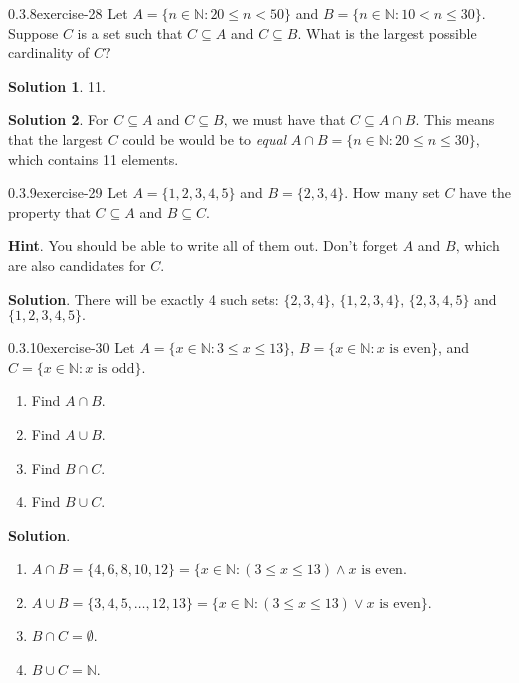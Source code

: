 \documentclass[twoside,11pt,]{book}
\numberwithin{equation}{chapter}
\newcommand{\N}{\mathbb N}
\newcommand{\st}{:}
\newcommand{\lt}{<}
\begin{document}
\begin{divisionsolution}{0.3.8}{}{exercise-28}%
\hypertarget{p-662}{}%
Let \(A = \{n \in \N \st 20 \le n \lt 50\}\) and \(B = \{n \in \N \st 10 \lt n \le 30\}\text{.}\) Suppose \(C\) is a set such that \(C \subseteq A\) and \(C \subseteq B\text{.}\) What is the largest possible cardinality of \(C\text{?}\)%
\par\smallskip%
\noindent\textbf{Solution 1}.\quad%
\hypertarget{p-663}{}%
11.%
\par\smallskip%
\noindent\textbf{Solution 2}.\quad%
\hypertarget{p-664}{}%
For \(C \subseteq A\) and \(C \subseteq B\text{,}\) we must have that \(C \subseteq A \cap B\text{.}\) This means that the largest \(C\) could be would be to \emph{equal} \(A \cap B = \{n \in \N \st 20 \le n \le 30\}\text{,}\) which contains 11 elements.%
\end{divisionsolution}%
\begin{divisionsolution}{0.3.9}{}{exercise-29}%
\hypertarget{p-669}{}%
Let \(A = \{1,2,3,4,5\}\) and \(B = \{2, 3, 4\}\text{.}\) How many set \(C\) have the property that \(C \subseteq A\) and \(B \subseteq C\text{.}\)%
\par\smallskip%
\noindent\textbf{Hint}.\quad%
\hypertarget{p-671}{}%
You should be able to write all of them out. Don't forget \(A\) and \(B\text{,}\) which are also candidates for \(C\text{.}\)%
\par\smallskip%
\noindent\textbf{Solution}.\quad%
\hypertarget{p-672}{}%
There will be exactly 4 such sets: \(\{2, 3, 4\}\text{,}\) \(\{1,2,3,4\}\text{,}\) \(\{2,3,4,5\}\) and \(\{1,2,3,4,5\}\text{.}\)%
\end{divisionsolution}%
\begin{divisionsolution}{0.3.10}{}{exercise-30}%
\hypertarget{p-673}{}%
Let \(A = \{x \in \N \st 3 \le x \le 13\}\), \(B = \{x \in \N \st x \mbox{ is even} \}\), and \(C = \{x \in \N \st x \mbox{ is odd} \}\).\leavevmode%
\begin{enumerate}[label=(\alph*)]
\item\hypertarget{li-620}{}\hypertarget{p-674}{}%
Find \(A \cap B\).%
\item\hypertarget{li-621}{}\hypertarget{p-675}{}%
Find \(A \cup B\).%
\item\hypertarget{li-622}{}\hypertarget{p-676}{}%
Find \(B \cap C\).%
\item\hypertarget{li-623}{}\hypertarget{p-677}{}%
Find \(B \cup C\).%
\end{enumerate}
%
\par\smallskip%
\noindent\textbf{Solution}.\quad%
\hypertarget{p-678}{}%
\leavevmode%
\begin{enumerate}[label=(\alph*)]
\item\hypertarget{li-624}{}\(A \cap B = \{4,6,8,10,12\} = \{x \in \N \st (3 \le x \le 13) \wedge x \mbox{ is even}\).%
\item\hypertarget{li-625}{}\(A \cup B = \{3, 4, 5, \ldots, 12, 13\} = \{x \in \N \st (3 \le x \le 13) \vee x \mbox{ is even} \}\).%
\item\hypertarget{li-626}{}\(B \cap C = \emptyset\).%
\item\hypertarget{li-627}{}\(B \cup C = \N\).%
\end{enumerate}
%
\end{divisionsolution}%
\end{document}
